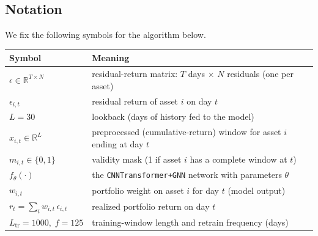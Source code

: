 \documentclass[11pt]{article}
\begin{document}
\subsection{Notation}
We fix the following symbols for the algorithm below.
\begin{center}
\small
\begin{tabular}{l l}
\toprule
Symbol & Meaning \\
\midrule
$\epsilon \in \mathbb{R}^{T\times N}$ & residual-return matrix: $T$ days $\times$ $N$ residuals (one per asset) \\
$\epsilon_{i,t}$                      & residual return of asset $i$ on day $t$ \\
$L = 30$                              & lookback (days of history fed to the model) \\
$x_{i,t} \in \mathbb{R}^{L}$          & preprocessed (cumulative-return) window for asset $i$ ending at day $t$ \\
$m_{i,t}\in\{0,1\}$                   & validity mask (1 if asset $i$ has a complete window at $t$) \\
$f_\theta(\cdot)$                     & the \texttt{CNNTransformer+GNN} network with parameters $\theta$ \\
$w_{i,t}$                             & portfolio weight on asset $i$ for day $t$ (model output) \\
$r_t = \sum_i w_{i,t}\,\epsilon_{i,t}$ & realized portfolio return on day $t$ \\
$L_{\text{tr}}=1000,\; f=125$          & training-window length and retrain frequency (days) \\
\bottomrule
\end{tabular}
\end{center}
\end{document}

